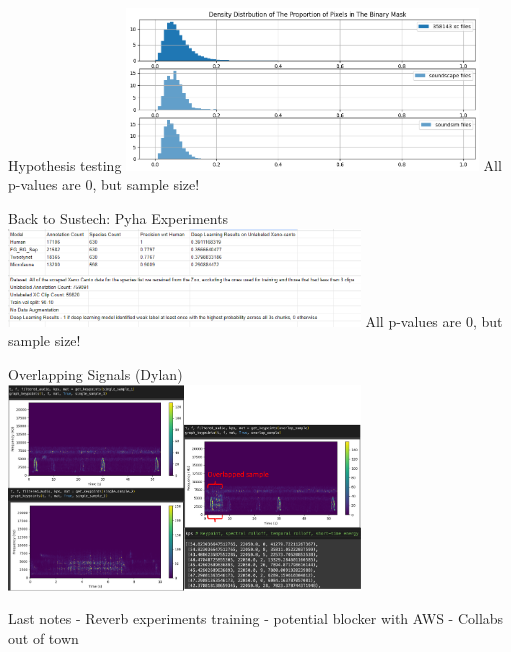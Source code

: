 \begin{frame}{Hypothesis testing}
    \centering
    \includegraphics[height=0.7\textheight,width=0.7\textwidth,keepaspectratio]{images/AID/output2.png}
    All p-values are 0, but sample size!
\end{frame}

\begin{frame}{Back to Sustech: Pyha Experiments}
    \centering
    \includegraphics[height=0.7\textheight,width=0.7\textwidth,keepaspectratio]{images/AID/sustech_results.png}
    All p-values are 0, but sample size!
\end{frame}

\begin{frame}{Overlapping Signals (Dylan)}
    \centering
    \includegraphics[height=0.7\textheight,width=0.7\textwidth,keepaspectratio]{images/AID/dylan-02-21.png}
\end{frame}

\begin{frame}{Last notes}
    - Reverb experiments training
    - potential blocker with AWS
    - Collabs out of town
\end{frame}
